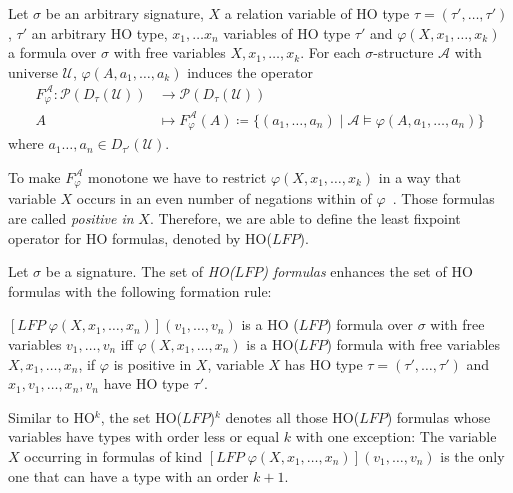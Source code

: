 \begin{definition}
\label{definition:induced_operator}
    Let $\sigma$ be an arbitrary signature, $X$ a relation variable of HO type $\tau = (\tau', \dots, \tau')$,
    $\tau'$ an arbitrary HO type, $x_1, \dots x_n$ variables of HO type $\tau'$ and $\varphi(X, x_1, \dots, x_k)$ a
    formula over $\sigma$ with free variables $X, x_1, \dots, x_k$. For each $\sigma$-structure $\mathcal{A}$ with
    universe $\mathcal{U}$, $\varphi(A, a_1, \dots, a_k)$ induces the operator
    \begin{align*}
        F_\varphi^\mathcal{A}\colon\mathscr{P}(D_\tau(\mathcal{U})) &\longrightarrow \mathscr{P}(D_\tau(\mathcal{U}))\\
        A &\longmapsto F_\varphi^\mathcal{A}(A) \coloneqq \{(a_1, \dots, a_n) \mid \mathcal{A} \models \varphi(A, a_1,
        \dots, a_n)\}
    \end{align*}
    where $a_1 \dots, a_n \in D_{\tau'}(\mathcal{U})$.
\end{definition}

To make $F_\varphi^\mathcal{A}$ monotone we have to restrict $\varphi(X, x_1, \dots, x_k)$ in a way that variable
$X$ occurs in an even number of negations within of $\varphi$~\cite{freireMartins2011descriptive}. Those formulas
are called \textit{positive in} $X$. Therefore, we are able to define the least fixpoint operator for HO
formulas, denoted by HO($\mathit{LFP}$).

\begin{definition}
    Let $\sigma$ be a signature. The set of \emph{HO($\mathit{LFP}$) formulas} enhances the set of HO formulas with the
    following formation rule:
    \begin{compactitem}
        \item $[\mathit{LFP}\;\varphi(X, x_1, \dots, x_n)](v_1, \dots, v_n)$ is a HO
        ($\mathit{LFP}$) formula over $\sigma$ with free variables $v_1, \dots, v_n$ iff $\varphi(X, x_1, \dots, x_n)
        $ is a HO($\mathit{LFP}$) formula with free variables $X, x_1, \dots, x_n$, if $\varphi$ is positive in
        $X$, variable $X$ has HO type $\tau = (\tau', \dots, \tau')$ and $x_1, v_1, \dots, x_n, v_n$ have HO type $\tau'$.
    \end{compactitem}
\end{definition}

Similar to HO$^k$, the set HO($\mathit{LFP}$)$^k$ denotes all those HO($\mathit{LFP}$) formulas whose variables have types with
order less or equal $k$ with one exception: The variable $X$ occurring in formulas of kind $[\mathit{LFP}\;\varphi(X, x_1, \dots, x_n)](v_1, \dots, v_n)$ is the only one that can have a type with an order $k+1$.


